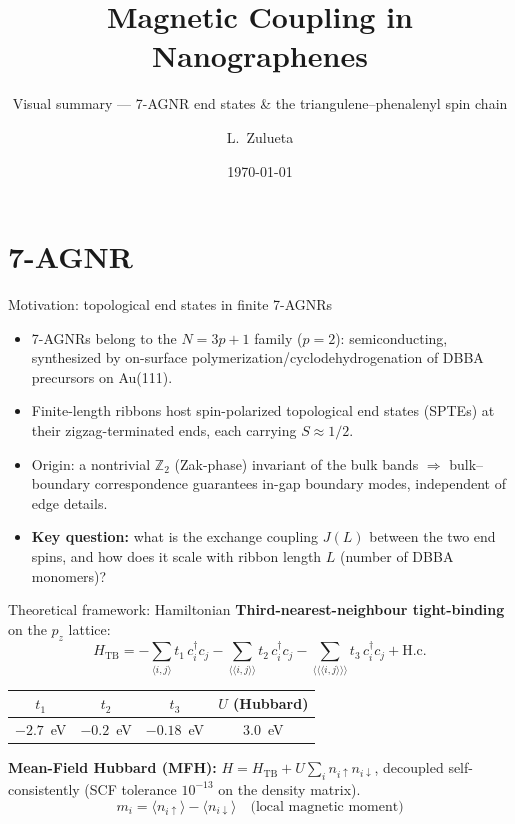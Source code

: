 \documentclass[aspectratio=169,11pt]{beamer}
\title{Magnetic Coupling in Nanographenes}
\subtitle{Visual summary --- 7-AGNR end states \& the triangulene--phenalenyl spin chain}
\author{L.~Zulueta}
\institute{CIC nanoGUNE, Donostia--San Sebasti\'an, Spain}
\date{\today}
\begin{document}
\maketitle

\section{7-AGNR}

\begin{frame}{Motivation: topological end states in finite 7-AGNRs}
  \begin{itemize}
    \item 7-AGNRs belong to the $N=3p+1$ family ($p=2$): semiconducting, synthesized by on-surface polymerization/cyclodehydrogenation of DBBA precursors on Au(111).
    \item Finite-length ribbons host \alert{spin-polarized topological end states} (SPTEs) at their zigzag-terminated ends, each carrying $S \approx 1/2$.
    \item Origin: a nontrivial $\mathbb{Z}_2$ (Zak-phase) invariant of the bulk bands $\Rightarrow$ bulk--boundary correspondence guarantees in-gap boundary modes, independent of edge details.
    \item \textbf{Key question:} what is the exchange coupling $J(L)$ between the two end spins, and how does it scale with ribbon length $L$ (number of DBBA monomers)?
  \end{itemize}
\end{frame}

\begin{frame}{Theoretical framework: Hamiltonian}
  \textbf{Third-nearest-neighbour tight-binding} on the $p_z$ lattice:
  \[
    H_{\mathrm{TB}} = -\sum_{\langle i,j\rangle} t_1\, c_i^\dagger c_j - \sum_{\langle\langle i,j\rangle\rangle} t_2\, c_i^\dagger c_j - \sum_{\langle\langle\langle i,j\rangle\rangle\rangle} t_3\, c_i^\dagger c_j + \mathrm{H.c.}
  \]
  \begin{center}
  \begin{tabular}{cccc}
    \toprule
    $t_1$ & $t_2$ & $t_3$ & $U$ (Hubbard) \\
    \midrule
    $-2.7$~eV & $-0.2$~eV & $-0.18$~eV & $3.0$~eV \\
    \bottomrule
  \end{tabular}
  \end{center}
  \textbf{Mean-Field Hubbard (MFH):} $H = H_{\mathrm{TB}} + U\sum_i n_{i\uparrow} n_{i\downarrow}$, decoupled self-consistently (SCF tolerance $10^{-13}$ on the density matrix).
  \[
    m_i = \langle n_{i\uparrow}\rangle-\langle n_{i\downarrow}\rangle \quad\text{(local magnetic moment)}
  \]
\end{frame}
\end{document}
